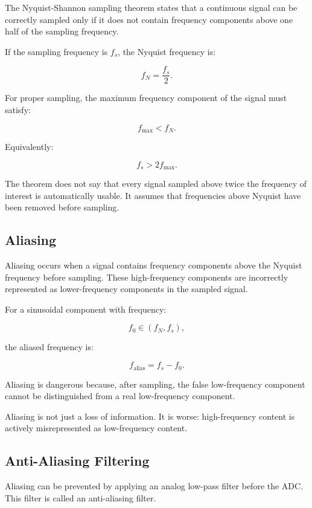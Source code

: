 The Nyquist-Shannon sampling theorem states that a continuous signal can be correctly sampled only if it does not contain frequency components above one half of the sampling frequency.

If the sampling frequency is $f_s$, the Nyquist frequency is:

\[
f_N =
\frac{f_s}{2}.
\]

For proper sampling, the maximum frequency component of the signal must satisfy:

\[
f_{\max} < f_N.
\]

Equivalently:

\[
f_s > 2 f_{\max}.
\]

\begin{authornote}
The theorem does not say that every signal sampled above twice the frequency of interest is automatically usable. It assumes that frequencies above Nyquist have been removed before sampling.
\end{authornote}

\subsection{Aliasing}

Aliasing occurs when a signal contains frequency components above the Nyquist frequency before sampling. These high-frequency components are incorrectly represented as lower-frequency components in the sampled signal.

For a sinusoidal component with frequency:

\[
f_0 \in (f_N, f_s),
\]

the aliased frequency is:

\[
f_{\text{alias}}
=
f_s - f_0.
\]

Aliasing is dangerous because, after sampling, the false low-frequency component cannot be distinguished from a real low-frequency component.

\begin{authornote}
Aliasing is not just a loss of information. It is worse: high-frequency content is actively misrepresented as low-frequency content.
\end{authornote}

\subsection{Anti-Aliasing Filtering}

Aliasing can be prevented by applying an analog low-pass filter before the ADC. This filter is called an anti-aliasing filter.


